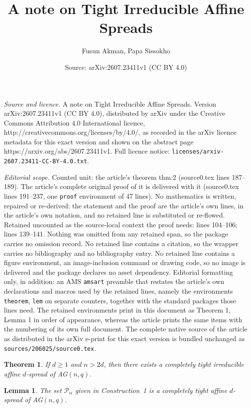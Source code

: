 \documentclass[10pt,a4paper]{amsart}
\title{A note on Tight Irreducible Affine Spreads}
\author{Fusun Akman, Papa Sissokho}
\date{Source: arXiv:2607.23411v1 (CC BY 4.0)}
\newtheorem{theorem}{Theorem}
\newtheorem{lem}{Lemma}
\def \P{{\mathcal P}}
\def \al{\alpha}
\begin{document}
\maketitle

\noindent\emph{Source and licence.} A note on Tight Irreducible Affine Spreads. Version arXiv:2607.23411v1 (CC BY 4.0), distributed by arXiv under the Creative Commons Attribution 4.0 International licence, http://creativecommons.org/licenses/by/4.0/, as recorded in the arXiv licence metadata for this exact version and shown on the abstract page https://arxiv.org/abs/2607.23411v1. Full licence notice: \texttt{licenses/arxiv-2607.23411-CC-BY-4.0.txt}.\par\smallskip

\noindent\textit{Editorial scope.} Counted unit: the article's theorem thm:2 (source0.tex lines 187--189). The article's complete original proof of it is delivered with it (source0.tex lines 191--237, one \texttt{proof} environment of 47 lines). No mathematics is written, repaired or re-derived: the statement and the proof are the article's own lines, in the article's own notation, and no retained line is substituted or re-flowed.  Retained uncounted as the source-local context the proof needs: lines 104--106; lines 139--141.  Nothing was omitted from any retained span, so the package carries no omission record.  No retained line contains a citation, so the wrapper carries no bibliography and no bibliography entry.  No retained line contains a figure environment, an image-inclusion command or drawing code, so no image is delivered and the package declares no asset dependency.  Editorial formatting only, in addition: an AMS \texttt{amsart} preamble that restates the article's own declarations and macros used by the retained lines, namely the environments \texttt{theorem}, \texttt{lem} on separate counters, together with the standard packages those lines need.  The retained environments print in this document as Theorem 1, Lemma 1 in order of appearance, whereas the article prints the same items with the numbering of its own full document.  The complete native source of the article as distributed in the arXiv e-print for this exact version is bundled unchanged as \texttt{sources/206025/source0.tex}.
\begin{theorem}\label{thm:1}
If $d \geq 1$ and $n>2d$, then there exists a completely tight irreducible affine $d$-spread of AG$(n,q)$.  
\end{theorem}

\begin{lem}\label{lem:1}
The set $\P_\al$  given in Construction~1 is  a completely tight affine $d$-spread of  AG$(n,q)$.
\end{lem}
\end{document}
